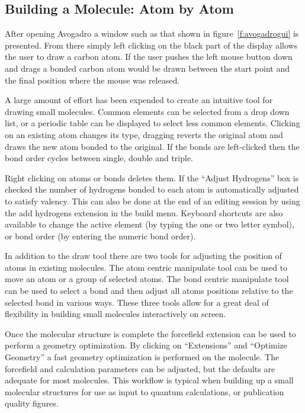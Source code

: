 \documentclass{article}
\begin{document}
\subsection{Building a Molecule: Atom by Atom}

After opening Avogadro a window such as that shown in figure~\ref{f:avogadrogui} is presented. From there simply left clicking on the black part of the display allows the user to draw a carbon atom. If the user pushes the left mouse button down and drags a bonded carbon atom would be drawn between the start point and the final position where the mouse was released.

A large amount of effort has been expended to create an intuitive tool for drawing small molecules. Common elements can be selected from a drop down list, or a periodic table can be displayed to select less common elements. Clicking on an existing atom changes its type, dragging reverts the original atom and draws the new atom bonded to the original. If the bonds are left-clicked then the bond order cycles between single, double and triple.

Right clicking on atoms or bonds deletes them. If the ``Adjust Hydrogens'' box is checked the number of hydrogens bonded to each atom is automatically adjusted to satisfy valency. This can also be done at the end of an editing session by using the add hydrogens extension in the build menu. Keyboard shortcuts are also available to change the active element (by typing the one or two letter symbol), or bond order (by entering the numeric bond order).

In addition to the draw tool there are two tools for adjusting the position of atoms in existing molecules. The atom centric manipulate tool can be used to move an atom or a group of selected atoms. The bond centric manipulate tool can be used to select a bond and then adjust all atoms positions relative to the selected bond in various ways. These three tools allow for a great deal of flexibility in building small molecules interactively on screen.

Once the molecular structure is complete the forcefield extension can be used to perform a geometry optimization. By clicking on ``Extensions'' and ``Optimize Geometry'' a fast geometry optimization is performed on the molecule. The forcefield and calculation parameters can be adjusted, but the defaults are adequate for most molecules. This workflow is typical when building up a small molecular structures for use as input to quantum calculations, or publication quality figures.
\end{document}
